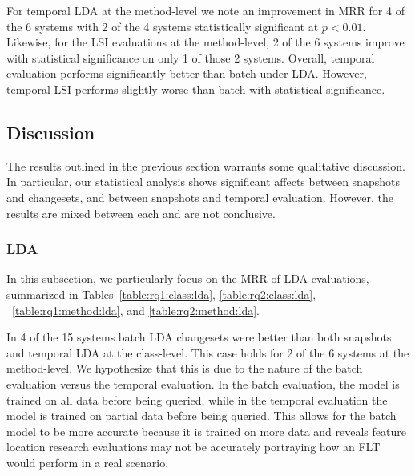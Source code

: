 For temporal LDA at the method-level we note an improvement in MRR for 4 of the
6 systems with 2 of the 4 systems statistically significant at $p<0.01$.
Likewise, for the LSI evaluations at the method-level, 2 of the 6 systems
improve with statistical significance on only 1 of those 2 systems.  Overall,
temporal evaluation performs significantly better than batch under LDA.
However, temporal LSI performs slightly worse than batch with statistical
significance.



\subsection{Discussion}

The results outlined in the previous section warrants some qualitative
discussion.  In particular, our statistical analysis shows significant affects
between snapshots and changesets, and between snapshots and temporal
evaluation.  However, the results are mixed between each and are not
conclusive.

\subsubsection{LDA}
In this subsection, we particularly focus on the MRR of LDA evaluations,
summarized in Tables~\ref{table:rq1:class:lda}, \ref{table:rq2:class:lda},
~\ref{table:rq1:method:lda}, and \ref{table:rq2:method:lda}.

In 4 of the 15 systems batch LDA changesets were better than both snapshots and
temporal LDA at the class-level.  This case holds for 2 of the 6 systems at the
method-level.  We hypothesize that this is due to the nature of the batch
evaluation versus the temporal evaluation.  In the batch evaluation, the model
is trained on all data before being queried, while in the temporal evaluation
the model is trained on partial data before being queried.  This allows for the
batch model to be more accurate because it is trained on more data and reveals
feature location research evaluations may not be accurately portraying how an
FLT would perform in a real scenario.

